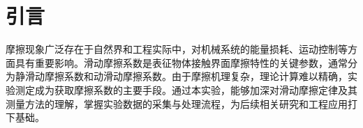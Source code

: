 \section{引言}
摩擦现象广泛存在于自然界和工程实际中，对机械系统的能量损耗、运动控制等方面具有重要影响。滑动摩擦系数是表征物体接触界面摩擦特性的关键参数，通常分为静滑动摩擦系数和动滑动摩擦系数。由于摩擦机理复杂，理论计算难以精确，实验测定成为获取摩擦系数的主要手段。通过本实验，能够加深对滑动摩擦定律及其测量方法的理解，掌握实验数据的采集与处理流程，为后续相关研究和工程应用打下基础。